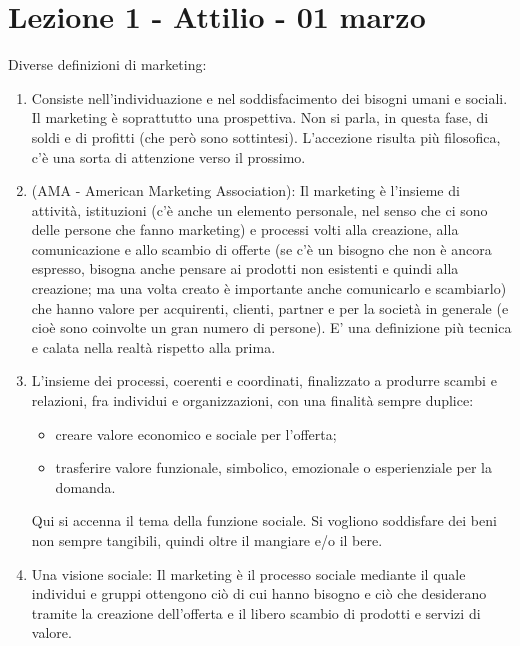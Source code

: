 \documentclass[11pt]{article}
\begin{document}
\section{Lezione 1 - Attilio - 01 marzo}
Diverse definizioni di marketing:
\begin{enumerate}[noitemsep,topsep=0ex]
	\item Consiste nell'individuazione e nel soddisfacimento dei bisogni umani e sociali. 
	Il marketing è soprattutto una prospettiva.
	Non si parla, in questa fase, di soldi e di profitti (che però sono sottintesi). 
	L'accezione risulta più filosofica, c'è una sorta di attenzione verso il prossimo.
	
	\item (AMA - American Marketing Association): Il marketing è l'insieme di attività, istituzioni (c'è anche un elemento personale, nel senso che ci sono delle persone che fanno marketing) e processi volti alla creazione, alla comunicazione e allo scambio di offerte (se c'è un bisogno che non è ancora espresso, bisogna anche pensare ai prodotti non esistenti e quindi alla creazione; ma una volta creato è importante anche comunicarlo e scambiarlo) che hanno valore per acquirenti, clienti, partner e per la società in generale (e cioè sono coinvolte un gran numero di persone). 
	E' una definizione più tecnica e calata nella realtà rispetto alla prima.
	
	\item L'insieme dei processi, coerenti e coordinati, finalizzato a produrre scambi e relazioni, fra individui e organizzazioni, con una finalità sempre duplice: 
	\begin{itemize}[noitemsep]
		\item creare valore economico e sociale per l'offerta;
		\item trasferire valore funzionale, simbolico, emozionale o esperienziale per la domanda.
	\end{itemize} 
	Qui si accenna il tema della funzione sociale. 
	Si vogliono soddisfare dei beni non sempre tangibili, quindi oltre il mangiare e/o il bere.
	
	\item Una visione sociale: Il marketing è il processo sociale mediante il quale individui e gruppi ottengono ciò di cui hanno bisogno e ciò che desiderano tramite la creazione dell'offerta e il libero scambio di prodotti e servizi di valore.
\end{enumerate}
\end{document}
